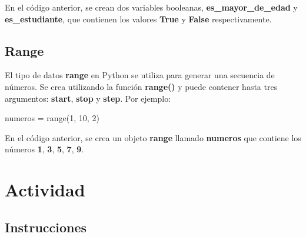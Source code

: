 \documentclass[
  a4paper,
  DIV=11,
  numbers=noendperiod,
  onepage,
  openany]{scrreprt}
\newenvironment{Shaded}{\begin{snugshade}}{\end{snugshade}}
\newcommand{\BuiltInTok}[1]{\textcolor[rgb]{0.00,0.23,0.31}{#1}}
\newcommand{\DecValTok}[1]{\textcolor[rgb]{0.68,0.00,0.00}{#1}}
\newcommand{\NormalTok}[1]{\textcolor[rgb]{0.00,0.23,0.31}{#1}}
\newcommand{\OperatorTok}[1]{\textcolor[rgb]{0.37,0.37,0.37}{#1}}
\begin{document}
En el código anterior, se crean dos variables booleanas,
\textbf{es\_mayor\_de\_edad} y \textbf{es\_estudiante}, que contienen
los valores \textbf{True} y \textbf{False} respectivamente.

\section{Range}\label{range}

El tipo de datos \textbf{range} en Python se utiliza para generar una
secuencia de números. Se crea utilizando la función \textbf{range()} y
puede contener hasta tres argumentos: \textbf{start}, \textbf{stop} y
\textbf{step}. Por ejemplo:

\begin{Shaded}
\begin{Highlighting}[]
\NormalTok{numeros }\OperatorTok{=} \BuiltInTok{range}\NormalTok{(}\DecValTok{1}\NormalTok{, }\DecValTok{10}\NormalTok{, }\DecValTok{2}\NormalTok{)}
\end{Highlighting}
\end{Shaded}

En el código anterior, se crea un objeto \textbf{range} llamado
\textbf{numeros} que contiene los números \textbf{1}, \textbf{3},
\textbf{5}, \textbf{7}, \textbf{9}.

\chapter{Actividad}\label{actividad-1}

\section{Instrucciones}\label{instrucciones-1}
\end{document}
